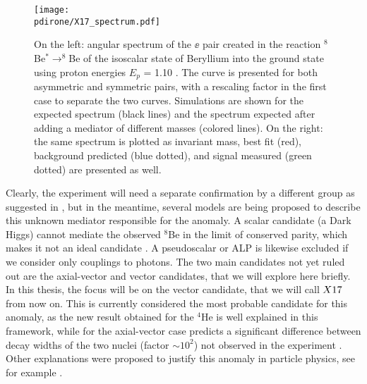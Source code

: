 \begin{figure}[htb!]
  \centering
  \texttt{[image: \\pdirone/X17\_spectrum.pdf]}
  \caption[$^8$Be anomaly]{On the left: angular spectrum of the $\ee$ pair created in the reaction $^8$Be$^* \to ^8$Be of the isoscalar state of Beryllium into the ground state using proton energies $E_p$ = 1.10 \mev. The curve is presented for both asymmetric and symmetric pairs, with a rescaling factor in the first case to separate the two curves. Simulations are shown for the expected spectrum (black lines) and the spectrum expected after adding a mediator of different masses (colored lines). On the right: the same spectrum is plotted as invariant mass, best fit (red), background predicted (blue dotted), and signal measured (green dotted) are presented as well. \cite{Krasznahorkay:2015iga}}
  \label{fig:be-anomaly}
\end{figure}

Clearly, the experiment will need a separate confirmation by a different group as suggested in \cite{Feng:2020mbt}, but in the meantime, several models are being proposed to describe this unknown mediator responsible for the anomaly. A scalar candidate (a Dark Higgs) cannot mediate the observed $^8$Be in the limit of conserved parity, which makes it not an ideal candidate \cite{PhysRevD.95.035017}. A pseudoscalar or ALP is likewise excluded if we consider only couplings to photons. The two main candidates not yet ruled out are the axial-vector and vector candidates, that we will explore here briefly. In this thesis, the focus will be on the vector candidate, that we will call $X17$ from now on. This is currently considered the most probable candidate for this anomaly, as the new result obtained for the $^4$He is well explained in this framework, while for the axial-vector case predicts a significant difference between decay widths of the two nuclei (factor $\sim10^2$) not observed in the experiment \cite{Feng:2020mbt}. Other explanations were proposed to justify this anomaly in particle physics, see for example \cite{Nam:2019osu, Seto:2016pks}.

